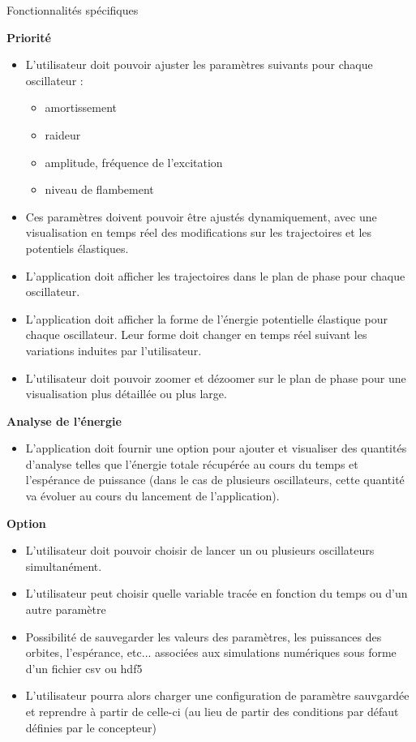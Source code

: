 \documentclass[a4paper, french, 12pt, titlepage]{article}
\begin{document}
\large{Fonctionnalités spécifiques}

\textbf{Priorité}
\begin{itemize}
 \item L'utilisateur doit pouvoir ajuster les paramètres suivants pour chaque oscillateur : 
 \begin{itemize}
 \item amortissement
 \item raideur
 \item amplitude, fréquence de l'excitation
 \item niveau de flambement
 \end{itemize}
 \item Ces paramètres doivent pouvoir être ajustés dynamiquement, avec une visualisation en temps réel des modifications sur les trajectoires et les potentiels élastiques.
 \item L'application doit afficher les trajectoires dans le plan de phase pour chaque oscillateur.
\item L'application doit afficher la forme de l'énergie potentielle élastique pour chaque oscillateur. Leur forme doit changer en temps réel suivant les variations induites par l'utilisateur.
 \item L'utilisateur doit pouvoir zoomer et dézoomer sur le plan de phase pour une visualisation plus détaillée ou plus large.
\end{itemize}


\textbf{Analyse de l'énergie}
\begin{itemize}
\item L'application doit fournir une option pour ajouter et visualiser des quantités d'analyse telles que l'énergie totale récupérée au cours du temps et l'espérance de puissance (dans le cas de plusieurs oscillateurs, cette quantité va évoluer au cours du lancement de l'application).
\end{itemize}

\textbf{Option}
\begin{itemize}

 \item L'utilisateur doit pouvoir choisir de lancer un ou plusieurs oscillateurs simultanément.
 \item L'utilisateur peut choisir quelle variable tracée en fonction du temps ou d'un autre paramètre 
 \item Possibilité de sauvegarder les valeurs des paramètres, les puissances des orbites, l'espérance, etc... associées aux simulations numériques sous forme d'un fichier csv ou hdf5
 \item L'utilisateur pourra alors charger une configuration de paramètre sauvgardée et reprendre à partir de celle-ci (au lieu de partir des conditions par défaut définies par le concepteur)

\end{itemize}
\end{document}
